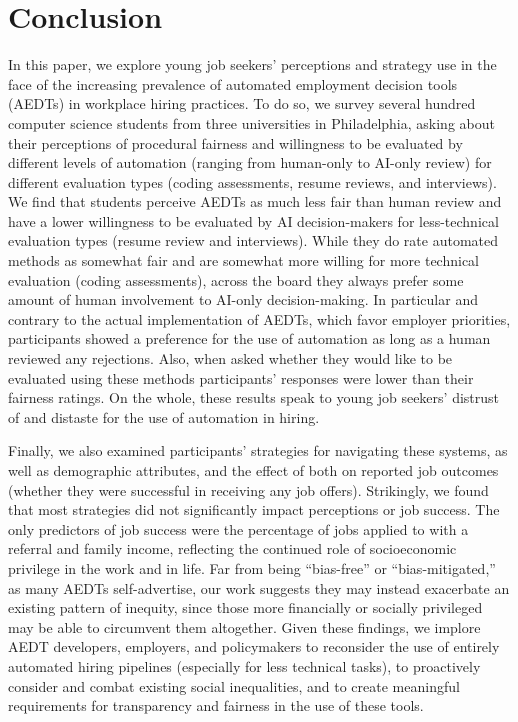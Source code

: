 \section{Conclusion}

In this paper, we explore young job seekers' perceptions and strategy use in the face of the increasing prevalence of automated employment decision tools (AEDTs) in workplace hiring practices. To do so, we survey several hundred computer science students from three universities in Philadelphia, asking about their perceptions of procedural fairness and willingness to be evaluated by different levels of automation (ranging from human-only to AI-only review) for different evaluation types (coding assessments, resume reviews, and interviews). We find that students perceive AEDTs as much less fair than human review and have a lower willingness to be evaluated by AI decision-makers for less-technical evaluation types (resume review and interviews). While they do rate automated methods as somewhat fair and are somewhat more willing for more technical evaluation (coding assessments), across the board they always prefer some amount of human involvement to AI-only decision-making. In particular and contrary to the actual implementation of AEDTs, which favor employer priorities, participants showed a preference for the use of automation as long as a human reviewed any rejections. Also, when asked whether they would like to be evaluated using these methods participants' responses were lower than their fairness ratings. On the whole, these results speak to young job seekers' distrust of and distaste for the use of automation in hiring. 

Finally, we also examined participants' strategies for navigating these systems, as well as demographic attributes, and the effect of both on reported job outcomes (whether they were successful in receiving any job offers). Strikingly, we found that most strategies did not significantly impact perceptions or job success. The only predictors of job success were the percentage of jobs applied to with a referral and family income, reflecting the continued role of socioeconomic privilege in the work and in life.
Far from being ``bias-free'' or ``bias-mitigated,'' as many AEDTs self-advertise, our work suggests they may instead exacerbate an existing pattern of inequity, since those more financially or socially privileged may be able to circumvent them altogether. Given these findings, we implore AEDT developers, employers, and policymakers to reconsider the use of entirely automated hiring pipelines (especially for less technical tasks), to proactively consider and combat existing social inequalities, and to create meaningful requirements for transparency and fairness in the use of these tools. 